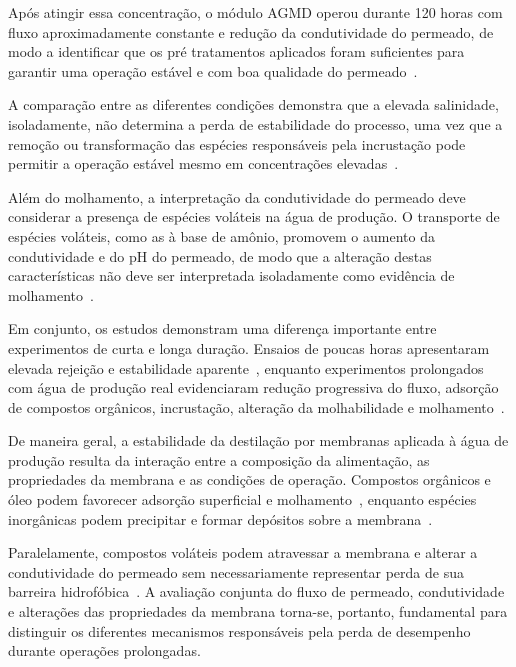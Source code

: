 Após atingir essa concentração, o módulo AGMD operou durante 120 horas com fluxo aproximadamente constante e redução da condutividade do permeado, de modo a identificar que os pré tratamentos aplicados foram suficientes para garantir uma operação estável e com boa qualidade do permeado~\cite{Pawar2022AGMD}.

A comparação entre as diferentes condições demonstra que a elevada salinidade, isoladamente, não determina a perda de estabilidade do processo, uma vez que a remoção ou transformação das espécies responsáveis pela incrustação pode permitir a operação estável mesmo em concentrações elevadas~\cite{Pawar2022AGMD}. 

Além do molhamento, a interpretação da condutividade do permeado deve considerar a presença de espécies voláteis na água de produção. O transporte de espécies voláteis, como as à base de amônio, promovem o aumento da condutividade e do pH do permeado, de modo que a alteração destas características não deve ser interpretada isoladamente como evidência de molhamento~\cite{Pawar2022, Pawar2022AGMD}.

Em conjunto, os estudos demonstram uma diferença importante entre experimentos de curta e longa duração. Ensaios de poucas horas apresentaram elevada rejeição e estabilidade aparente~\cite{Singh2011DCMD,
Macedonio2014_MD_ProducedWater}, enquanto experimentos prolongados com água de produção real evidenciaram redução progressiva do fluxo, adsorção de compostos orgânicos, incrustação, alteração da molhabilidade e molhamento~\cite{Thakur2020SGMD, Hsieh2021Pretreatments,
Nawaz2021FO_MD, Pawar2022AGMD}.

De maneira geral, a estabilidade da destilação por membranas aplicada à água de produção resulta da interação entre a composição da alimentação, as propriedades da membrana e as condições de operação. Compostos orgânicos e óleo podem favorecer adsorção superficial e molhamento~\cite{Hsieh2021Pretreatments, Nawaz2021FO_MD}, enquanto espécies inorgânicas podem precipitar e formar depósitos sobre a membrana~\cite{Nawaz2021FO_MD,Pawar2022AGMD}. 

Paralelamente, compostos voláteis podem atravessar a membrana e alterar a condutividade do permeado sem necessariamente representar perda de sua barreira hidrofóbica~\cite{Pawar2022, Pawar2022AGMD}. A avaliação conjunta do fluxo de permeado, condutividade e alterações das propriedades da membrana torna-se, portanto, fundamental para distinguir os diferentes mecanismos responsáveis pela perda de desempenho durante operações prolongadas.

